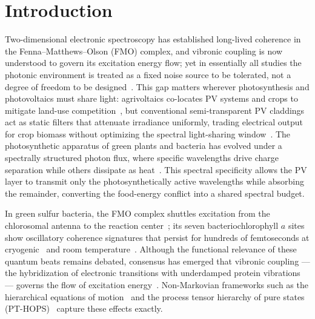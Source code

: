 \documentclass[12pt]{iopart}
\begin{document}

\section{Introduction}

Two-dimensional electronic spectroscopy has established long-lived coherence in the Fenna--Matthews--Olson (FMO) complex, and vibronic coupling is now understood to govern its excitation energy flow; yet in essentially all studies the photonic environment is treated as a fixed noise source to be tolerated, not a degree of freedom to be designed~\cite{Engel2007,Panitchayangkoon2010,Chin2013}.
This gap matters wherever photosynthesis and photovoltaics must share light: agrivoltaics co-locates PV systems and crops to mitigate land-use competition~\cite{Goetzberger1981,Dupraz2011}, but conventional semi-transparent PV claddings act as static filters that attenuate irradiance uniformly, trading electrical output for crop biomass without optimizing the spectral light-sharing window~\cite{Thompson2020,Alshareef2024}.
The photosynthetic apparatus of green plants and bacteria has evolved under a spectrally structured photon flux, where specific wavelengths drive charge separation while others dissipate as heat~\cite{Blankenship2011}.
This spectral specificity allows the PV layer to transmit only the photosynthetically active wavelengths while absorbing the remainder, converting the food-energy conflict into a shared spectral budget.

In green sulfur bacteria, the FMO complex shuttles excitation from the chlorosomal antenna to the reaction center~\cite{Fenna1974}; its seven bacteriochlorophyll $a$ sites show oscillatory coherence signatures that persist for hundreds of femtoseconds at cryogenic~\cite{Engel2007} and room temperature~\cite{Panitchayangkoon2010}.
Although the functional relevance of these quantum beats remains debated, consensus has emerged that vibronic coupling --- the hybridization of electronic transitions with underdamped protein vibrations --- governs the flow of excitation energy~\cite{Chin2013,Christensson2012}.
Non-Markovian frameworks such as the hierarchical equations of motion~\cite{Tanimura1989} and the process tensor hierarchy of pure states (PT-HOPS)~\cite{Varvelo2021,Citty2024} capture these effects exactly.
\end{document}
